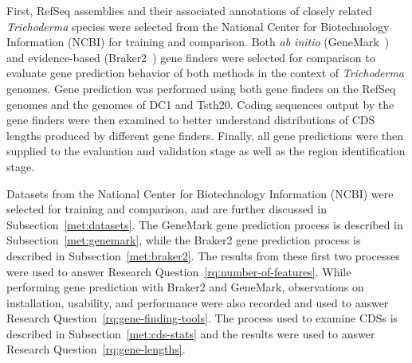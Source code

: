 First, RefSeq assemblies and their associated annotations of closely
related \textit{Trichoderma} species were selected from the National Center for Biotechnology Information (NCBI) for
training and comparison. Both \textit{ab initio}
(GeneMark~\cite{borodovsky2011a}) and evidence-based
(Braker2~\cite{bruna2021a}) gene finders were selected for comparison to
evaluate gene prediction behavior of both methods in the context of
\textit{Trichoderma} genomes. Gene prediction was performed using both
gene finders on the RefSeq genomes and the genomes of DC1 and
Tsth20. Coding sequences output by the gene finders were then
examined to better understand distributions of CDS lengths produced by
different gene finders. Finally, all gene predictions were then
supplied to the evaluation and validation stage as well as the region
identification stage.

Datasets from the National Center for Biotechnology Information (NCBI) were selected for training and comparison, and are further
discussed in Subsection~\ref{met:datasets}. The GeneMark gene prediction
process is described in Subsection~\ref{met:genemark}, while the Braker2
gene prediction process is described in Subsection~\ref{met:braker2}. The results from these first two processes were used to answer Research Question~\ref{rq:number-of-features}. While performing gene prediction with Braker2 and GeneMark, observations on installation, usability, and performance were also recorded and used to answer Research Question~\ref{rq:gene-finding-tools}.
The
process used to examine CDSs is described in Subsection~\ref{met:cds-stats} and the results were used to answer Research Question~\ref{rq:gene-lengths}.


